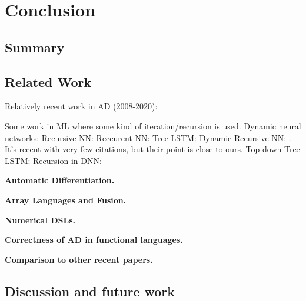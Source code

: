 \section{Conclusion}
\label{sec:conclusion}

\subsection{Summary} %
\label{sub:summary}

\subsection{Related Work} %
\label{sub:related_work}

Relatively recent work in AD (2008-2020):
\cite{mak2020differential,elliotthigher,vytiniotis2019differentiable,innes2018don,baydin2017automatic,huot2020correctness,gallagher-sdg,manzyuk2012confusion,wang2018demystifying,beck1994if,wang2018backpropagation,betancourt2018geometric,elliott2018simple,carpenter2015stan,paszke2017automatic,shaikhha2019efficient,innes2019zygote,griewank2008evaluating,kucukelbir2017automatic,brunel2019backpropagation,barthe2020versatility,abadi2019simple,cockett2019reverse,van2018automatic,hascoet2013tapenade,abadi2016tensorflow,pearlmutter2008reverse,bergstra2010theano,fong2019backprop,ehrhard2003differential,agrawal2019tensorflow,bettencourt2019taylor,cruttwell2017cartesian,manzyuk2012simply,laue2018computing}

Some work in ML where some kind of iteration/recursion is used.
Dynamic neural networks: \cite{jin2017manipulability,wu2016deep}
Recursive NN: \cite{socher2011parsing,biancofiore2017recursive}
Reccurent NN: \cite{bahdanau2014neural,luong2015effective}
Tree LSTM: \cite{tai2015improved,chen2016enhanced}
Dynamic Recursive NN: \cite{guo2019dynamic}. It's recent with very few citations, but their point is close to ours. 
Top-down Tree LSTM: \cite{zhang2015top}
Recursion in DNN: \cite{jeong2018improving}

\noindent \textbf{Automatic Differentiation.} 

\noindent \textbf{Array Languages and Fusion.}

\noindent \textbf{Numerical DSLs.} 

\noindent \textbf{Correctness of AD in functional languages.}

\noindent \textbf{Comparison to other recent papers.}

\subsection{Discussion and future work} %
\label{sub:discussion_and_future_work}

